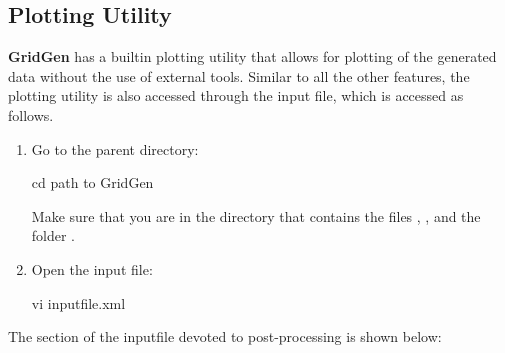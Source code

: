 \documentclass[letterpaper,10pt,english]{sphinxmanual}
\begin{document}
\subsection{Plotting Utility}
\label{\detokenize{gridpyfiles/plot:plot}}\label{\detokenize{gridpyfiles/plot::doc}}\label{\detokenize{gridpyfiles/plot:plotting-utility}}
{\color{red}\bfseries{}\textbar{}GridGen\textbar{}} has a builtin plotting utility that allows for plotting of the generated data without the use of external tools. Similar to all the other features, the plotting utility is also accessed through the input file, which is accessed as follows.
\begin{enumerate}
\item {} 
Go to the parent directory:

\begin{sphinxVerbatim}[commandchars=\\\{\}]
\PYGZdl{} cd \PYGZlt{}path to \textbar{}GridGen\textbar{}\PYGZgt{}
\end{sphinxVerbatim}

Make sure that you are in the directory that contains the files , , and the folder .

\item {} 
Open the input file:

\begin{sphinxVerbatim}[commandchars=\\\{\}]
\PYGZdl{} vi input\PYGZus{}file.xml
\end{sphinxVerbatim}

\end{enumerate}

The section of the inputfile devoted to post-processing is shown below:
\end{document}
